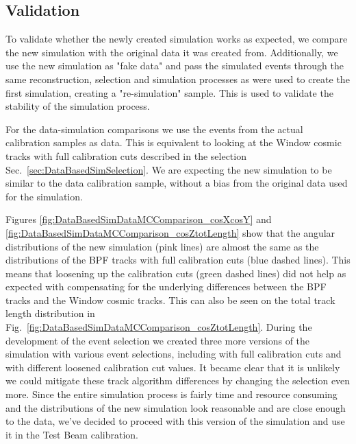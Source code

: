 \subsection{Validation}
To validate whether the newly created simulation works as expected, we compare the new simulation with the original data it was created from. Additionally, we use the new simulation as "fake data" and pass the simulated events through the same reconstruction, selection and simulation processes as were used to create the first simulation, creating a "re-simulation" sample. This is used to validate the stability of the simulation process.

For the data-simulation comparisons we use the events from the actual calibration samples as data. This is equivalent to looking at the Window cosmic tracks with full calibration cuts described in the selection Sec.~\ref{sec:DataBasedSimSelection}. We are expecting the new simulation to be similar to the data calibration sample, without a bias from the original data used for the simulation.

Figures \ref{fig:DataBasedSimDataMCComparison_cosXcosY} and \ref{fig:DataBasedSimDataMCComparison_cosZtotLength} show that the angular distributions of the new simulation (pink lines) are almost the same as the distributions of the \gls{BPF} tracks with full calibration cuts (blue dashed lines). This means that loosening up the calibration cuts (green dashed lines) did not help as expected with compensating for the underlying differences between the \gls{BPF} tracks and the Window cosmic tracks. This can also be seen on the total track length distribution in Fig.~\ref{fig:DataBasedSimDataMCComparison_cosZtotLength}. During the development of the event selection we created three more versions of the simulation with various event selections, including with full calibration cuts and with different loosened calibration cut values. It became clear that it is unlikely we could mitigate these track algorithm differences by changing the selection even more. Since the entire simulation process is fairly time and resource consuming and the distributions of the new simulation look reasonable and are close enough to the data, we've decided to proceed with this version of the simulation and use it in the Test Beam calibration.


